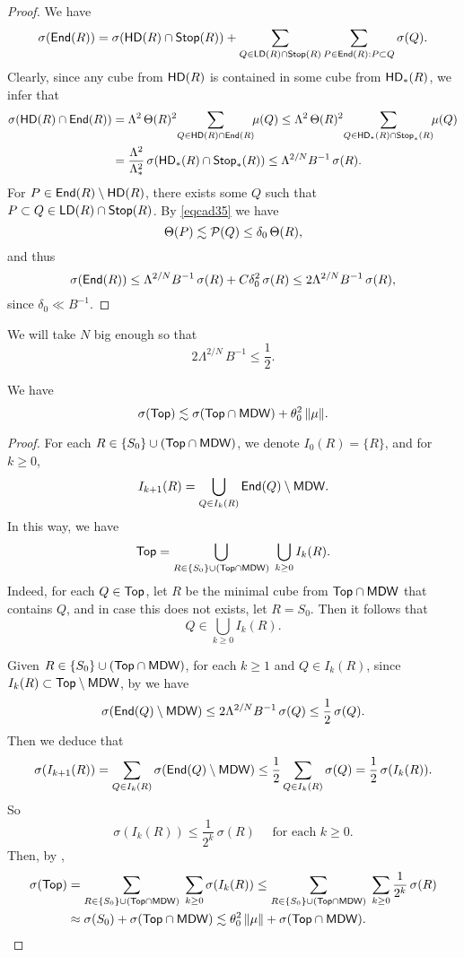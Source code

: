  
\begin{proof}
We have
$$\sigma({\mathsf{End}}(R)) = \sigma({\mathsf{HD}}(R)\cap{\mathsf {Stop}}(R)) + \sum_{Q\in{\mathsf{LD}}(R)\cap{\mathsf {Stop}}(R)}\sum_{P\in{\mathsf{End}}(R):P\subset Q}
\sigma(Q).$$
Clearly, since any cube from ${\mathsf{HD}}(R)$ is contained in some cube from ${\mathsf{HD}}_*(R)$, we infer that
\begin{align*}
\sigma({\mathsf{HD}}(R)\cap{\mathsf{End}}(R)) & =\Lambda^2\,\Theta(R)^2\!\sum_{Q\in {\mathsf{HD}}(R)\cap{\mathsf{End}}(R)}\!\!\mu(Q)
\leq \Lambda^2\,\Theta(R)^2\!\sum_{Q\in {\mathsf{HD}}_*(R)\cap{\mathsf {Stop}}_*(R)}\!\!\mu(Q) \\
& = \frac{\Lambda^2}{\Lambda_*^2}\,\sigma
({\mathsf{HD}}_*(R)\cap{\mathsf {Stop}}_*(R))\leq \Lambda^{2/N}B^{-1}\,\sigma(R).
\end{align*}
For $P\in{\mathsf{End}}(R)\setminus{\mathsf{HD}}(R)$, there exists some $Q$ such that $P\subset Q\in{\mathsf{LD}}(R)\cap{\mathsf {Stop}}(R)$.  By \eqref{eqcad35} we have 
$$\Theta(P)\lesssim{\mathcal P}(Q)\leq \delta_0\,\Theta(R),$$
and thus
$$
\sigma({\mathsf{End}}(R)) \leq \Lambda^{2/N} B^{-1}\,\sigma(R) + C\delta_0^2\,\sigma(R) \leq 2\Lambda^{2/N} B^{-1}\,\sigma(R),
$$
since $\delta_0\ll B^{-1}$.
\end{proof}
\vv

We will take $N$ big enough so that 
$$2\Lambda^{2/N}\,B^{-1}\leq \frac12.$$


\begin{lemma}\label{lemtoptop}
We have
$$\sigma({\mathsf {Top}})  \lesssim \sigma({\mathsf {Top}}\cap{\mathsf{MDW}})+ \theta_0^2\,\|\mu\|.$$
\end{lemma}

\begin{proof}
For each $R\in \{S_0\}\cup ({\mathsf {Top}}\cap{\mathsf{MDW}})$, we denote
$I_0(R)=\{R\}$, and for $k\geq0$,
$$I_{k+1}(R) = \bigcup_{Q\in I_k(R)} {\mathsf{End}}(Q)\setminus {\mathsf{MDW}}.$$ 
In this way, we have
\begin{equation}\label{eqtttot}
{\mathsf {Top}} = \bigcup_{R\in \{S_0\}\cup ({\mathsf {Top}}\cap{\mathsf{MDW}})} \;\bigcup_{k\geq0} I_k(R).
\end{equation}
Indeed, for each $Q\in {\mathsf {Top}}$, let $R$ be the minimal cube from ${\mathsf {Top}}\cap{\mathsf{MDW}}$ that contains $Q$, and in case this does not exists, let $R=S_0$. Then it follows that
$$Q\in \bigcup_{k\geq0} I_k(R).$$

Given $R\in\{S_0\}\cup ({\mathsf {Top}}\cap{\mathsf{MDW}})$, for each $k\geq 1$ and $Q\in I_k(R)$, 
since $I_k(R)\subset {\mathsf {Top}}\setminus {\mathsf{MDW}}$, by  we have 
$$\sigma({\mathsf{End}}(Q)\setminus {\mathsf{MDW}})\leq 2 \Lambda^{2/N}B^{-1}\,\sigma(Q)\leq \frac12\,\sigma(Q).$$
Then we deduce that
$$\sigma(I_{k+1}(R)) = \sum_{Q\in I_k(R)} \sigma({\mathsf{End}}(Q)\setminus {\mathsf{MDW}}) \leq \frac12 \sum_{Q\in I_k(R)}\sigma(Q)
= \frac12\, \sigma(I_k(R)).$$
So 
$$\sigma(I_{k}(R))\leq \frac1{2^k}\,\sigma(R)\quad \mbox{ for each $k\geq0$.}$$
Then, by , 
\begin{align*}
\sigma({\mathsf {Top}}) & = \sum_{R\in \{S_0\}\cup ({\mathsf {Top}}\cap{\mathsf{MDW}})} \;\sum_{k\geq0} \sigma(I_k(R))
\leq \sum_{R\in \{S_0\}\cup ({\mathsf {Top}}\cap{\mathsf{MDW}})}\;\sum_{k\geq0} \frac1{2^k}\,\sigma(R) \\
& \approx \sigma(S_0) + \sigma({\mathsf {Top}}\cap{\mathsf{MDW}})
\lesssim \theta_0^2\,\|\mu\|+\sigma({\mathsf {Top}}\cap{\mathsf{MDW}}).
\end{align*}
\end{proof}

